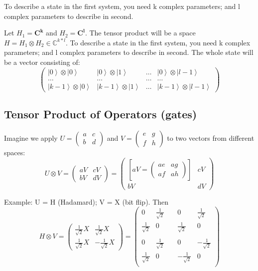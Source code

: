 \documentclass{scrartcl}
\newcommand{\cplx}{\mathbb{C}} %
\newcommand{\ket}[1]{\left| #1 \right>} %
\begin{document}
To describe a state in the first system, you need k complex parameters; and l
complex parameters to describe in second.

Let $H_1 = \mathbf{C^k}$ and $H_2 = \mathbf{C^l}$. The tensor product will be a
space $H = H_1 \otimes H_2 \in \cplx^{k*l}$. To describe a state in the
first system, you need k complex parameters; and l complex parameters to
describe in second. The whole state will be a vector consisting of:
$$\begin{pmatrix}
  \ket0 \otimes \ket0 & \ket0 \otimes \ket1& \dots& \ket0 \otimes \ket{l-1} \\
  \dots &\dots & \dots & \dots \\
  \ket{k-1}\otimes \ket0 & \ket{k-1} \otimes \ket1 & \dots & \ket{k-1} \otimes
  \ket{l-1}
\end{pmatrix}$$

\subsection{Tensor Product of Operators (gates)}
\label{sec:7-5}

Imagine we apply $U= \begin{pmatrix} a & c \\ b & d \end{pmatrix}$ and
$V= \begin{pmatrix} e & g \\ f & h \end{pmatrix}$ to two vectors from different
spaces: $$U \otimes V = \begin{pmatrix} aV & cV \\ bV & dV \end{pmatrix} =
\begin{pmatrix} \left[ aV = \begin{pmatrix} ae & ag \\ af & ah \end{pmatrix}
  \right] & cV \\ bV & dV \end{pmatrix}$$

Example: U = H (Hadamard); V = X (bit flip). Then
$$H \otimes V =\begin{pmatrix} \frac1{\sqrt2}X & \frac1{\sqrt2}X \\
  \frac1{\sqrt2}X & -\frac1{\sqrt2}X \end{pmatrix} =
\begin{pmatrix}
  0 & \frac1{\sqrt2} & \; & 0 & \frac1{\sqrt2} \\
  \frac1{\sqrt2} & 0 & \; & \frac1{\sqrt2} & 0 \\
  \; \\
  0 & \frac1{\sqrt2} & \; & 0 & -\frac1{\sqrt2} \\
  \frac1{\sqrt2} & 0 & \; & -\frac1{\sqrt2} & 0 \\
\end{pmatrix}$$
\end{document}
